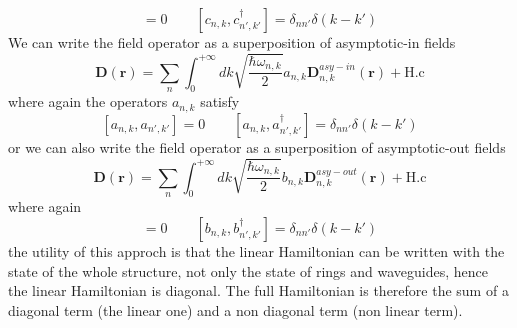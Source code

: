 \documentclass[12pt]{book}
\renewcommand{\r}{\mathbf{r}}
\begin{document}
\begin{equation}[c_{n,k},c_{n',k'}] = 0 \qquad [c_{n,k},c_{n',k'}^\dagger] = \delta_{nn'}\delta(k-k')\end{equation}
We can write the field operator as a superposition of asymptotic-in fields
\begin{equation}\label{dasyin}\mathbf{D}(\r) = \sum_n \int_{0}^{+\infty}dk \sqrt{\frac{\hbar \omega_{n,k}}{2}}a_{n,k}\mathbf{D}_{n,k}^{asy-in}(\r) + \text{H.c}\end{equation}
where again the operators $a_{n,k}$ satisfy
\begin{equation}\label{acommutator}[a_{n,k},a_{n',k'}] = 0 \qquad [a_{n,k},a_{n',k'}^\dagger] = \delta_{nn'}\delta(k-k')\end{equation}
or we can also write the field operator as a superposition of asymptotic-out fields
\begin{equation}\label{dasyout}\mathbf{D}(\r) = \sum_n \int_{0}^{+\infty}dk \sqrt{\frac{\hbar \omega_{n,k}}{2}}b_{n,k}\mathbf{D}_{n,k}^{asy-out}(\r) + \text{H.c}\end{equation}
where again
\begin{equation}[b_{n,k},b_{n',k'}] = 0 \qquad [b_{n,k},b_{n',k'}^\dagger] = \delta_{nn'}\delta(k-k')\end{equation}
the utility of this approch is that the linear Hamiltonian can be written with the state of the whole structure, not only the state of rings and waveguides, hence the linear Hamiltonian is diagonal. The full Hamiltonian is therefore the sum of a diagonal term (the linear one) and a non diagonal term (non linear term).
\end{document}
